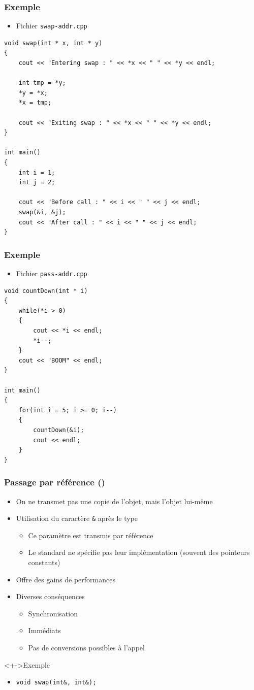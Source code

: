 \begin{frame}[containsverbatim]
\frametitle{Exemple}
\begin{itemize}[<+->]
\item Fichier \texttt{swap-addr.cpp}
\end{itemize}
\begin{lstlisting}
void swap(int * x, int * y)
{
	cout << "Entering swap : " << *x << " " << *y << endl;	

	int tmp = *y;
	*y = *x;
	*x = tmp;

	cout << "Exiting swap : " << *x << " " << *y << endl;
}

int main()
{
	int i = 1;
	int j = 2;

	cout << "Before call : " << i << " " << j << endl;
	swap(&i, &j);
	cout << "After call : " << i << " " << j << endl;
}
\end{lstlisting}
\end{frame}

\begin{frame}[containsverbatim]
\frametitle{Exemple}
\begin{itemize}[<+->]
\item Fichier \texttt{pass-addr.cpp}
\end{itemize}
\begin{lstlisting}
void countDown(int * i)
{
	while(*i > 0)
	{
		cout << *i << endl;
		*i--;
	}
	cout << "BOOM" << endl;
}

int main()
{
	for(int i = 5; i >= 0; i--)
	{
		countDown(&i);
		cout << endl;
	}
}
\end{lstlisting}
\end{frame}

\begin{frame}
\frametitle{Passage par référence (\cpp)}
\begin{itemize}[<+->]
\item On ne transmet pas une copie de l'objet, mais l'objet lui-même
\item Utilisation du caractère \texttt{\&} après le type
	\begin{itemize}
	\item Ce paramètre est transmis par référence
   \item Le standard ne spécifie pas leur implémentation (souvent des pointeurs constants)
	\end{itemize}
\item Offre des gains de performances
\item Diverses conséquences
	\begin{itemize}
	\item Synchronisation
	\item Immédiats
	\item Pas de conversions possibles à l'appel
	\end{itemize}
\end{itemize}
\begin{exampleblock}<+->{Exemple}
	\begin{itemize}[<+->]
	\item \lstinline|void swap(int&, int&);|
	\end{itemize}
\end{exampleblock}
\end{frame}

